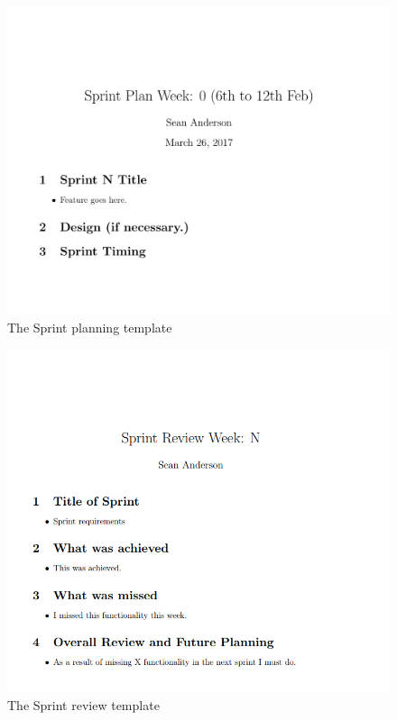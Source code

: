 \begin{center} 
\begin{figure}[H]
\includegraphics[width=\textwidth,height=\textheight,keepaspectratio]{images/sp}
\caption{The Sprint planning template}
\end{figure}
\begin{figure}[H]
\includegraphics[width=\textwidth,height=\textheight,keepaspectratio]{images/sr}
\caption{The Sprint review template}
\end{figure}
\end{center}

